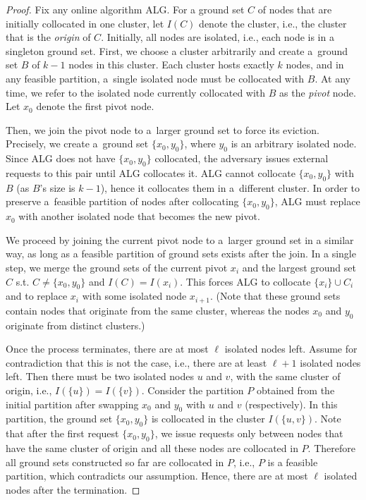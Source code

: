 \documentclass[a4paper,anonymous,USenglish]{lipics-v2019}
\newcommand{\ALG}{\textsc{ALG}\xspace}
\begin{document}
\begin{proof}
	Fix any online algorithm \ALG.
	For a ground set $C$ of nodes that are initially collocated in one cluster,
	let $I(C)$ denote the cluster,
	i.e., the cluster that is the \emph{origin} of $C$.
	Initially, all nodes are isolated, i.e., each node is in a singleton ground set.
	First, we choose a cluster arbitrarily and
	 create a~ground set $B$ of $k-1$ nodes in this cluster.
	Each cluster hosts exactly $k$ nodes, and in any feasible partition,
	 a~single isolated node must be collocated with $B$.
	At any time,
	we refer to the isolated node currently collocated with $B$ as the \emph{pivot} node.
	Let $x_0$ denote the first pivot node.

	Then, we join the pivot node to a~larger ground set to force its eviction.
	Precisely,
	we create a~ground set $\{x_0, y_0\}$, 	where
	 $y_0$ is an arbitrary isolated node.
	Since \ALG does not have $\{x_0,y_0\}$ collocated, 
	the adversary issues external requests to this pair until \ALG collocates it.
	\ALG cannot collocate $\{x_0, y_0\}$ with $B$ (as $B$'s size is $k-1$), hence it collocates them in a~different cluster.
	In order to preserve a~feasible partition of nodes after collocating $\{x_0, y_0\}$,
	\ALG must replace $x_0$ with another isolated node that becomes the new pivot.

	We proceed by joining the current pivot node to a~larger ground set in a similar way, as long as a feasible partition of ground sets exists after the join.
	In a single step, we merge the ground sets of the current pivot $x_i$ and the largest ground set $C$ s.t. $C \neq \{x_0,y_0\}$ and $I(C) = I(x_i)$.
	This forces \ALG to collocate $\{x_i\} \cup C_i $ and to replace $x_i$ with some isolated node $x_{i+1}$.
	(Note that these ground sets contain nodes that originate from the same cluster, whereas the nodes $x_0$ and $y_0$ originate from distinct clusters.)

	 
	 Once the process terminates,
	 there are at most $\ell$ isolated nodes left. 
	 Assume for contradiction that this is not the case,
	 i.e., there are at least $\ell+1$ isolated nodes left.
	 Then there must be two isolated nodes $u$ and $v$,
	  with the same cluster of origin,
	 i.e., $I(\{u\}) = I(\{v\})$.
	 Consider the partition $P$
	  obtained from the initial partition after swapping $x_0$ and $y_0$
	 with $u$ and $v$ (respectively).
	 In this partition,
	 the ground set $\{x_0,y_0\}$ is collocated in the cluster $I(\{u,v\})$.
	 Note that after the first request $\{x_0,y_0\}$,
	   we issue requests only between nodes that have the same cluster of origin and
	   all these nodes are collocated in $P$.
	 Therefore all ground sets constructed so far are collocated in  $P$,
	 i.e., $P$ is a feasible partition,
	 which contradicts our assumption.
	 Hence, there are at most $\ell$ isolated nodes after the termination.
	

\end{proof}
\end{document}
